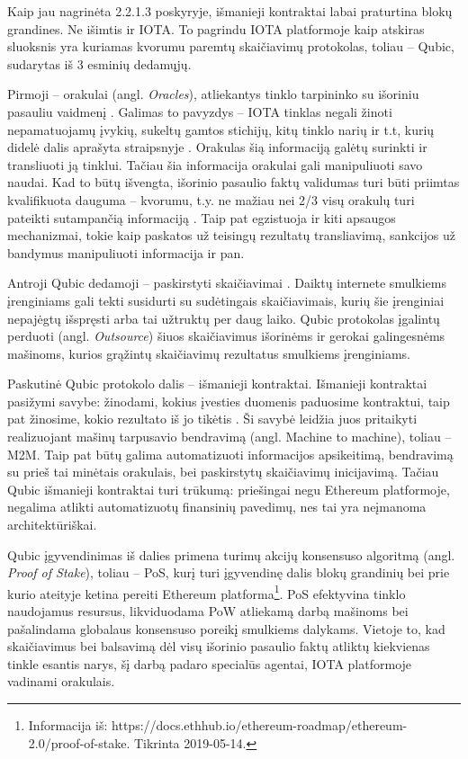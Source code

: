 
Kaip jau nagrinėta 2.2.1.3 poskyryje, išmanieji kontraktai labai praturtina blokų grandines. Ne išimtis ir IOTA. To pagrindu IOTA platformoje kaip atskiras sluoksnis yra kuriamas kvorumu paremtų skaičiavimų protokolas, toliau – Qubic, sudarytas iš 3 esminių dedamųjų.

Pirmoji – orakulai (angl. \textit{Oracles}), atliekantys tinklo tarpininko su išoriniu pasauliu vaidmenį \cite{iota2017oracles}. Galimas to pavyzdys – IOTA tinklas negali žinoti nepamatuojamų įvykių, sukeltų gamtos stichijų, kitų tinklo narių ir t.t, kurių didelė dalis aprašyta straipsnyje \cite{behdani2012handle}. Orakulas šią informaciją galėtų surinkti ir transliuoti ją tinklui. Tačiau šia informacija orakulai gali manipuliuoti savo naudai. Kad to būtų išvengta, išorinio pasaulio faktų validumas turi būti priimtas kvalifikuota dauguma – kvorumu, t.y. ne mažiau nei 2/3 visų orakulų turi pateikti sutampančią informaciją \cite{iota2017oracles}. Taip pat egzistuoja ir kiti apsaugos mechanizmai, tokie kaip paskatos už teisingų rezultatų transliavimą, sankcijos už bandymus manipuliuoti informacija ir pan.

Antroji Qubic dedamoji – paskirstyti skaičiavimai \cite{iota2017oracles}. Daiktų internete smulkiems įrenginiams gali tekti susidurti su sudėtingais skaičiavimais, kurių šie įrenginiai nepajėgtų išspręsti arba tai užtruktų per daug laiko. Qubic protokolas įgalintų perduoti (angl. \textit{Outsource}) šiuos skaičiavimus išorinėms ir gerokai galingesnėms mašinoms, kurios grąžintų skaičiavimų rezultatus smulkiems įrenginiams.

Paskutinė Qubic protokolo dalis – išmanieji kontraktai. Išmanieji kontraktai pasižymi savybe: žinodami, kokius įvesties duomenis paduosime kontraktui, taip pat žinosime, kokio rezultato iš jo tikėtis \cite{iota2017oracles}. Ši savybė leidžia juos pritaikyti realizuojant mašinų tarpusavio bendravimą (angl. Machine to machine), toliau – M2M. Taip pat būtų galima automatizuoti informacijos apsikeitimą, bendravimą su prieš tai minėtais orakulais, bei paskirstytų skaičiavimų inicijavimą. Tačiau Qubic išmanieji kontraktai turi trūkumą: priešingai negu Ethereum platformoje, negalima atlikti automatizuotų finansinių pavedimų, nes tai yra neįmanoma architektūriškai.

Qubic įgyvendinimas iš dalies primena turimų akcijų konsensuso algoritmą (angl. \textit{Proof of Stake}), toliau – PoS, kurį turi įgyvendinę dalis blokų grandinių bei prie kurio ateityje ketina pereiti Ethereum platforma\footnote{Informacija iš: https://docs.ethhub.io/ethereum-roadmap/ethereum-2.0/proof-of-stake. Tikrinta 2019-05-14.}. PoS efektyvina tinklo naudojamus resursus, likviduodama PoW atliekamą darbą mašinoms bei pašalindama globalaus konsensuso poreikį smulkiems dalykams. Vietoje to, kad skaičiavimus bei balsavimą dėl visų išorinio pasaulio faktų atliktų kiekvienas tinkle esantis narys, šį darbą padaro specialūs agentai, IOTA platformoje vadinami orakulais.



